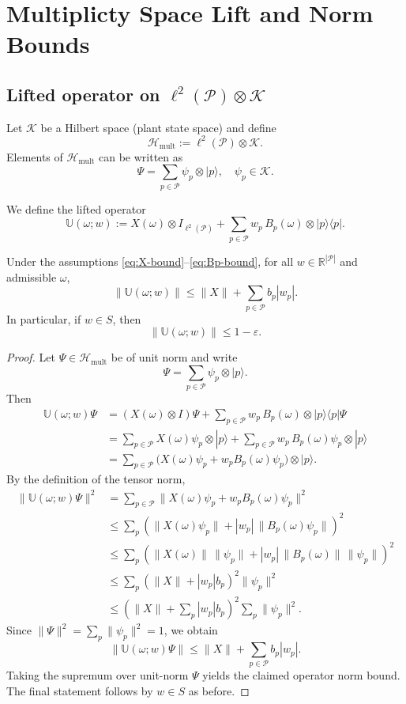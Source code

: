 \documentclass[11pt]{article}
\begin{document}
\section{Multiplicty Space Lift and Norm Bounds}

\subsection{Lifted operator on $\ell^2(\mathcal P)\otimes\mathcal K$}

Let $\mathcal K$ be a Hilbert space (plant state space) and define
\[
\mathcal H_{\mathrm{mult}}
:= \ell^2(\mathcal P)\otimes\mathcal K.
\]
Elements of $\mathcal H_{\mathrm{mult}}$ can be written as
\[
\Psi = \sum_{p\in\mathcal P} \psi_p \otimes |p\rangle,\quad \psi_p\in\mathcal K.
\]

We define the lifted operator
\[
\mathbb U(\omega;w)
:= X(\omega)\otimes I_{\ell^2(\mathcal P)}
   + \sum_{p\in\mathcal P} w_p\,B_p(\omega)\otimes |p\rangle\langle p|.
\]

\begin{lemma}\label{lem:lifted-norm}
Under the assumptions \eqref{eq:X-bound}--\eqref{eq:Bp-bound}, for all $w\in\mathbb R^{|\mathcal P|}$ and admissible $\omega$,
\[
\|\mathbb U(\omega;w)\|
\le \|X\| + \sum_{p\in\mathcal P} b_p |w_p|.
\]
In particular, if $w\in S$, then
\[
\|\mathbb U(\omega;w)\|\le 1 - \varepsilon.
\]
\end{lemma}

\begin{proof}
Let $\Psi\in\mathcal H_{\mathrm{mult}}$ be of unit norm and write
\[
\Psi = \sum_{p\in\mathcal P} \psi_p\otimes|p\rangle.
\]
Then
\begin{align*}
\mathbb U(\omega;w)\Psi
&= \left(X(\omega)\otimes I\right)\Psi
   + \sum_{p\in\mathcal P} w_p\, B_p(\omega)\otimes |p\rangle\langle p|\Psi\\
&= \sum_{p\in\mathcal P} X(\omega)\psi_p\otimes|p\rangle
   + \sum_{p\in\mathcal P} w_p\, B_p(\omega)\psi_p\otimes|p\rangle\\
&= \sum_{p\in\mathcal P} \bigl(X(\omega)\psi_p + w_p B_p(\omega)\psi_p\bigr)\otimes|p\rangle.
\end{align*}
By the definition of the tensor norm,
\begin{align*}
\|\mathbb U(\omega;w)\Psi\|^2
&= \sum_{p\in\mathcal P} \bigl\|X(\omega)\psi_p + w_p B_p(\omega)\psi_p\bigr\|^2\\
&\le \sum_p \left(\|X(\omega)\psi_p\| + |w_p|\,\|B_p(\omega)\psi_p\|\right)^2\\
&\le \sum_p \left(\|X(\omega)\|\,\|\psi_p\| + |w_p|\,\|B_p(\omega)\|\,\|\psi_p\|\right)^2\\
&\le \sum_p \left(\|X\| + |w_p| b_p\right)^2 \|\psi_p\|^2\\
&\le \left(\|X\| + \sum_p |w_p| b_p\right)^2 \sum_p \|\psi_p\|^2.
\end{align*}
Since $\|\Psi\|^2 = \sum_p \|\psi_p\|^2 = 1$, we obtain
\[
\|\mathbb U(\omega;w)\Psi\|
\le \|X\| + \sum_{p\in\mathcal P} b_p |w_p|.
\]
Taking the supremum over unit-norm $\Psi$ yields the claimed operator norm bound. The final statement follows by $w\in S$ as before.
\end{proof}
\end{document}
